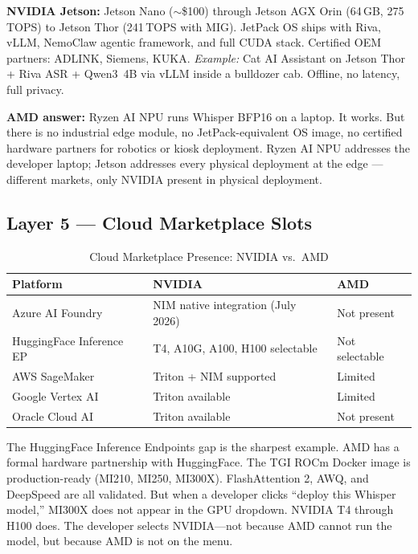 \documentclass[12pt,a4paper]{article}
\begin{document}
\textbf{NVIDIA Jetson:} Jetson Nano ($\sim$\$100) through Jetson AGX Orin
(64\,GB, 275\,TOPS) to Jetson Thor (241\,TOPS with MIG).  JetPack OS ships
with Riva, vLLM, NemoClaw agentic framework, and full CUDA stack.  Certified
OEM partners: ADLINK, Siemens, KUKA.  \textit{Example:} Cat AI Assistant on
Jetson Thor + Riva ASR + Qwen3~4B via vLLM inside a bulldozer cab.  Offline,
no latency, full privacy.

\textbf{AMD answer:} Ryzen AI NPU runs Whisper BFP16 on a laptop.  It works.
But there is no industrial edge module, no JetPack-equivalent OS image, no
certified hardware partners for robotics or kiosk deployment.  Ryzen AI NPU
addresses the developer laptop; Jetson addresses every physical deployment
at the edge --- different markets, only NVIDIA present in physical
deployment.

\subsection{Layer 5 --- Cloud Marketplace Slots}

\begin{table}[H]\centering
\caption{Cloud Marketplace Presence: NVIDIA vs.\ AMD}
\label{tab:cloud}
\begin{tabularx}{\textwidth}{lXX}
\toprule
\textbf{Platform} & \textbf{NVIDIA} & \textbf{AMD} \\
\midrule
Azure AI Foundry          & NIM native integration (July 2026) & Not present \\
HuggingFace Inference EP  & T4, A10G, A100, H100 selectable    & Not selectable \\
AWS SageMaker             & Triton + NIM supported             & Limited \\
Google Vertex AI          & Triton available                   & Limited \\
Oracle Cloud AI           & Triton available                   & Not present \\
\bottomrule
\end{tabularx}
\end{table}

The HuggingFace Inference Endpoints gap is the sharpest example.  AMD has a
formal hardware partnership with HuggingFace.  The TGI ROCm Docker image is
production-ready (MI210, MI250, MI300X).  FlashAttention 2, AWQ, and
DeepSpeed are all validated.  But when a developer clicks ``deploy this
Whisper model,'' MI300X does not appear in the GPU dropdown.  NVIDIA T4
through H100 does.  The developer selects NVIDIA---not because AMD cannot run
the model, but because AMD is not on the menu.
\end{document}
